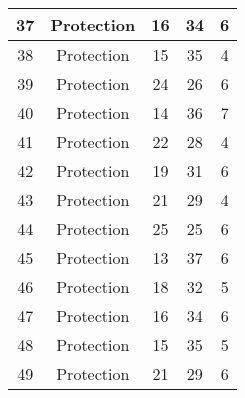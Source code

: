 \documentclass[results.tex]{subfiles}
\begin{document}
\begin{center}
\begin{tabular}{| c || c | c | c | c |}
            \hline
            37                      & Protection                   & 16                     & 34                      & 6                    \\
            \hline
            38                      & Protection                   & 15                     & 35                      & 4                    \\
            \hline
            39                      & Protection                   & 24                     & 26                      & 6                    \\
            \hline
            40                      & Protection                   & 14                     & 36                      & 7                    \\
            \hline
            41                      & Protection                   & 22                     & 28                      & 4                    \\
            \hline
            42                      & Protection                   & 19                     & 31                      & 6                    \\
            \hline
            43                      & Protection                   & 21                     & 29                      & 4                    \\
            \hline
            44                      & Protection                   & 25                     & 25                      & 6                    \\
            \hline
            45                      & Protection                   & 13                     & 37                      & 6                    \\
            \hline
            46                      & Protection                   & 18                     & 32                      & 5                    \\
            \hline
            47                      & Protection                   & 16                     & 34                      & 6                    \\
            \hline
            48                      & Protection                   & 15                     & 35                      & 5                    \\
            \hline
            49                      & Protection                   & 21                     & 29                      & 6                    \\
            \hline
        \end{tabular}
    \end{center}
\end{document}

